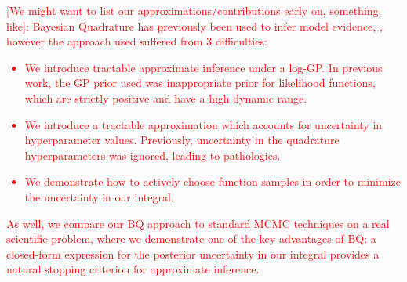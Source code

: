 \documentclass{article}
\begin{document}
\textcolor{red}{[We might want to list our approximations/contributions early on, something like]: Bayesian Quadrature has previously been used to infer model evidence, \citep{BZMonteCarlo}, however the approach used suffered from 3 difficulties: 
\begin{itemize}
\item We introduce tractable approximate inference under a log-GP.  In previous work, the GP prior used was inappropriate prior for likelihood functions, which are strictly positive and have a high dynamic range.
\item We introduce a tractable approximation which accounts for uncertainty in hyperparameter values.  Previously, uncertainty in the quadrature hyperparameters was ignored, leading to pathologies.  
\item We demonstrate how to actively choose function samples in order to minimize the uncertainty in our integral.
\end{itemize}
}
\textcolor{red}{
As well, we compare our BQ approach to standard MCMC techniques on a real scientific problem, where we demonstrate one of the key advantages of BQ: a closed-form expression for the posterior uncertainty in our integral provides a natural stopping criterion for approximate inference.}
\end{document}
